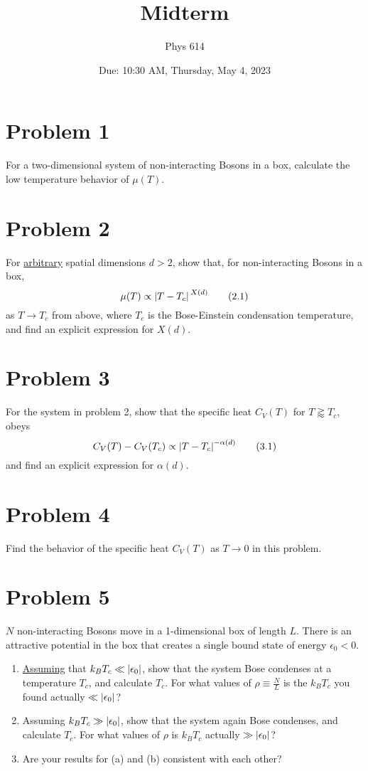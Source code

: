 \documentclass[12pt]{article}
\begin{document}
\title{Midterm}
\author{Phys 614}
\date{Due: 10:30 AM, Thursday, May 4, 2023}
\maketitle

\section*{Problem 1}
For a two-dimensional system of non-interacting Bosons in a box, calculate the low temperature behavior of $\mu(T)$.

\section*{Problem 2}
For \underline{arbitrary} spatial dimensions $d > 2$, show that, for non-interacting Bosons in a box,
\begin{equation}
    \mu(T) \propto \abs*{T-T_c}^{X(d)} \tag{2.1}
\end{equation}
as $T \to T_c$ from above, where $T_c$ is the Bose-Einstein condensation temperature, and find an explicit expression for $X(d)$.

\section*{Problem 3}
For the system in problem 2, show that the specific heat $C_V(T)$ for $T \gtrapprox T_c$, obeys
\begin{equation}
    C_V(T) - C_V(T_c) \propto \abs{T-T_c}^{-\alpha(d)} \tag{3.1}
\end{equation}
and find an explicit expression for $\alpha(d)$.

\section*{Problem 4}
Find the behavior of the specific heat $C_V(T)$ as $T \to 0$ in this problem.

\section*{Problem 5}
$N$ non-interacting Bosons move in a 1-dimensional box of length $L$. There is an attractive potential in the box that creates a single bound state of energy $\epsilon_0 < 0$.
\begin{enumerate}[label=(\alph*)]
    \item \underline{Assuming} that $k_BT_c \ll \abs{\epsilon_0}$, show that the system Bose condenses at a temperature $T_c$, and calculate $T_c$. For what values of $\rho \equiv \frac{N}{L}$ is the $k_BT_c$ you found actually $\ll \abs{\epsilon_0}$?
    \item Assuming $k_BT_c \gg \abs{\epsilon_0}$, show that the system again Bose condenses, and calculate $T_c$. For what values of $\rho$ is $k_BT_c$ actually $\gg \abs{\epsilon_0}$?
    \item Are your results for (a) and (b) consistent with each other?
\end{enumerate}
\end{document}

